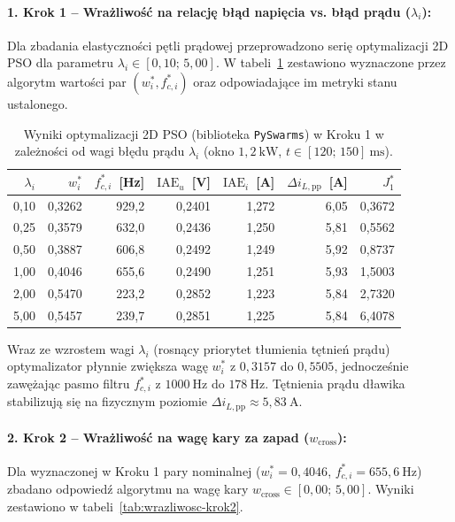 \paragraph{1. Krok 1 -- Wrażliwość na relację błąd napięcia vs. błąd prądu ($\lambda_i$):}
Dla zbadania elastyczności pętli prądowej przeprowadzono serię optymalizacji 2D PSO dla parametru $\lambda_i \in [0{,}10;\, 5{,}00]$. W tabeli~\ref{tab:wrazliwosc-krok1} zestawiono wyznaczone przez algorytm wartości par $(w_i^*, f_{c,i}^*)$ oraz odpowiadające im metryki stanu ustalonego.

\begin{table}[h!]
    \centering
    \caption{Wyniki optymalizacji 2D PSO (biblioteka \texttt{PySwarms}) w Kroku 1 w zależności od wagi błędu prądu $\lambda_i$ (okno $1{,}2~\mathrm{kW}$, $t \in [120;\, 150]~\mathrm{ms}$).}
    \label{tab:wrazliwosc-krok1}
    \begin{tabular}{rrrrrrr}
        \toprule
        $\lambda_i$ & $w_i^*$ & $f_{c,i}^*$~[Hz] & $\mathrm{IAE}_u$~[V] & $\mathrm{IAE}_i$~[A] & $\Delta i_{L,\mathrm{pp}}$~[A] & $J_1^*$ \\
        \midrule
        0{,}10 & 0{,}3262 & 929{,}2 & 0{,}2401 & 1{,}272 & 6{,}05 & 0{,}3672 \\
        0{,}25 & 0{,}3579 & 632{,}0 & 0{,}2436 & 1{,}250 & 5{,}81 & 0{,}5562 \\
        0{,}50 & 0{,}3887 & 606{,}8 & 0{,}2492 & 1{,}249 & 5{,}92 & 0{,}8737 \\
        1{,}00 & 0{,}4046 & 655{,}6 & 0{,}2490 & 1{,}251 & 5{,}93 & 1{,}5003 \\
        2{,}00 & 0{,}5470 & 223{,}2 & 0{,}2852 & 1{,}223 & 5{,}84 & 2{,}7320 \\
        5{,}00 & 0{,}5457 & 239{,}7 & 0{,}2851 & 1{,}225 & 5{,}84 & 6{,}4078 \\
        \bottomrule
    \end{tabular}
\end{table}

Wraz ze wzrostem wagi $\lambda_i$ (rosnący priorytet tłumienia tętnień prądu) optymalizator płynnie zwiększa wagę $w_i^*$ z $0{,}3157$ do $0{,}5505$, jednocześnie zawężając pasmo filtru $f_{c,i}^*$ z $1000~\mathrm{Hz}$ do $178~\mathrm{Hz}$. Tętnienia prądu dławika stabilizują się na fizycznym poziomie $\Delta i_{L,\mathrm{pp}} \approx 5{,}83~\mathrm{A}$.

\paragraph{2. Krok 2 -- Wrażliwość na wagę kary za zapad ($w_{\mathrm{cross}}$):}
Dla wyznaczonej w Kroku 1 pary nominalnej ($w_i^* = 0{,}4046$, $f_{c,i}^* = 655{,}6~\mathrm{Hz}$) zbadano odpowiedź algorytmu na wagę kary $w_{\mathrm{cross}} \in [0{,}00;\, 5{,}00]$. Wyniki zestawiono w tabeli~\ref{tab:wrazliwosc-krok2}.

